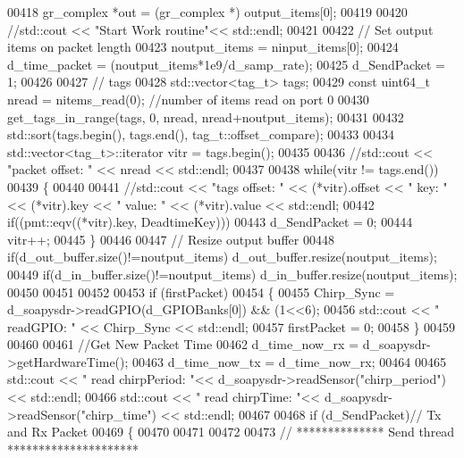 \begin{DoxyCode}
00418       gr\_complex *out = (gr\_complex *) output\_items[0];
00419 
00420       \textcolor{comment}{//std::cout << "Start Work routine"<< std::endl;}
00421 
00422       \textcolor{comment}{// Set output items on packet length}
00423       noutput\_items = ninput\_items[0];
00424       d_time_packet = (noutput\_items*1e9/d_samp_rate);
00425       d_SendPacket = 1;
00426 
00427       \textcolor{comment}{// tags}
00428       std::vector<tag\_t> tags;
00429       \textcolor{keyword}{const} uint64\_t nread = nitems\_read(0); \textcolor{comment}{//number of items read on port 0}
00430       get\_tags\_in\_range(tags, 0, nread, nread+noutput\_items);
00431 
00432       std::sort(tags.begin(), tags.end(), tag\_t::offset\_compare);
00433 
00434       std::vector<tag\_t>::iterator vitr = tags.begin();
00435 
00436       \textcolor{comment}{//std::cout << "packet offset: " << nread << std::endl;}
00437 
00438       \textcolor{keywordflow}{while}(vitr != tags.end())
00439       \{
00440 
00441         \textcolor{comment}{//std::cout << "tags offset: " << (*vitr).offset << " key: " << (*vitr).key << " value: " <<
       (*vitr).value << std::endl;}
00442         \textcolor{keywordflow}{if}((pmt::eqv((*vitr).key, DeadtimeKey)))
00443             d_SendPacket = 0;
00444         vitr++;
00445       \}
00446 
00447       \textcolor{comment}{// Resize output buffer}
00448       \textcolor{keywordflow}{if}(d_out_buffer.size()!=noutput\_items) d_out_buffer.resize(noutput\_items);
00449       \textcolor{keywordflow}{if}(d_in_buffer.size()!=noutput\_items) d_in_buffer.resize(noutput\_items);
00450 
00451 
00452 
00453       \textcolor{keywordflow}{if} (firstPacket)
00454       \{
00455         Chirp_Sync = d_soapysdr->readGPIO(d_GPIOBanks[0]) && (1<<6);
00456         std::cout << \textcolor{stringliteral}{" readGPIO: "} << Chirp_Sync << std::endl;
00457         firstPacket = 0;
00458       \}
00459 
00460 
00461       \textcolor{comment}{//Get New Packet Time}
00462       d_time_now_rx = d_soapysdr->getHardwareTime();
00463       d_time_now_tx = d_time_now_rx;
00464 
00465       std::cout << \textcolor{stringliteral}{" read chirpPeriod: "}<< d_soapysdr->readSensor(\textcolor{stringliteral}{"chirp\_period"}) << std::endl;
00466       std::cout << \textcolor{stringliteral}{" read chirpTime: "}<< d_soapysdr->readSensor(\textcolor{stringliteral}{"chirp\_time"}) << std::endl;
00467 
00468       \textcolor{keywordflow}{if} (d_SendPacket)\textcolor{comment}{// Tx and Rx Packet}
00469       \{
00470 
00471 
00472 
00473         \textcolor{comment}{// ************** Send thread *********************}

\end{DoxyCode}
